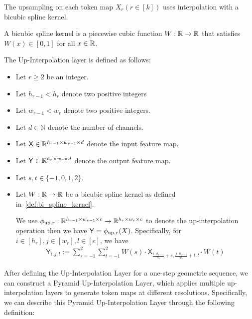 The upsampling on each token map $X_r (r \in [k])$ uses interpolation with a bicubic spline kernel.

\begin{definition}\label{def:bi_spline_kernel}
    A bicubic spline kernel is a piecewise cubic function $W: \mathbb{R} \to \mathbb{R}$ that satisfies $W(x) \in [0,1]$ for all $x \in \mathbb{R}$.
\end{definition}

\begin{definition}\label{def:up_inter_layer_one_step}
The Up-Interpolation layer is defined as follows:
\begin{itemize}
    \item Let $r \geq 2$ be an integer.
    \item Let $h_{r-1} < h_{r}$ denote two positive integers
    \item Let $w_{r-1} < w_{r}$ denote two positive integers.
    
    \item Let $d \in \mathbb{N}$ denote the number of channels.
    \item Let $\mathsf{X} \in \mathbb{R}^{h_{r-1} \times w_{r-1} \times d}$ denote the input feature map.
    \item Let $\mathsf{Y} \in \mathbb{R}^{h_{r} \times w_{r} \times d}$ denote the output feature map.
    \item Let $s,t \in \{-1,0,1,2\}$.
    \item Let $W: \mathbb{R} \to \mathbb{R}$ be a bicubic spline kernel as defined in~\ref{def:bi_spline_kernel}.
    
    We use $\phi_{{\rm up},r}: \mathbb{R}^{ h_{r-1} \times w_{r-1} \times c} \to \mathbb{R}^{h_{r} \times w_{r} \times c}$ to denote the up-interpolation operation then we have $\mathsf{Y} = \phi_{{\rm up}, r}(X)$. Specifically, for $i \in [h_{r}], j \in [w_{r}], l \in [c]$, we have
    \begin{align*}
        \mathsf{Y}_{i,j,l} := \sum_{s=-1}^2 \sum_{t=-1}^2 W(s) \cdot \mathsf{X}_{\frac{i \cdot h_{r-1}}{h_{r} }+s,\frac{j \cdot w_{r-1}}{w_{r}}+t,l} \cdot  W(t)
    \end{align*}
    
\end{itemize}
\end{definition}

After defining the Up-Interpolation Layer for a one-step geometric sequence, we can construct a Pyramid Up-Interpolation Layer, which applies multiple up-interpolation layers to generate token maps at different resolutions. Specifically, we can describe this Pyramid Up-Interpolation Layer through the following definition:

